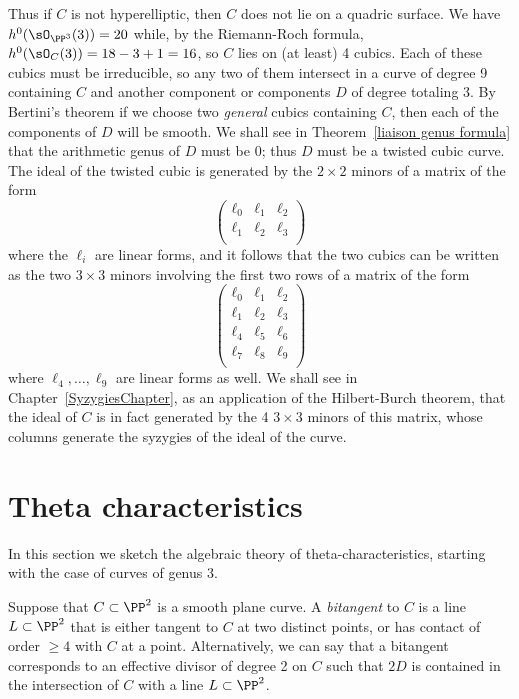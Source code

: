 Thus if $C$ is not hyperelliptic, then $C$ does not lie on a quadric surface. We have $h^0(\sO_{\PP^3}(3)) = 20$ while, by the Riemann-Roch formula, $h^0(\sO_C(3)) = 18-3+1= 16$, so $C$ lies on (at least) 4 cubics. Each of these cubics must be irreducible, so any two of them
intersect in a curve of degree 9 containing $C$ and another component or components $D$ of degree totaling 3. By Bertini's theorem
if we choose two \emph{general} cubics containing $C$, then each of the components of $D$ will be smooth. We shall see in Theorem~\ref{liaison genus formula} that the arithmetic genus of $D$ must be 0; thus $D$ must be a twisted cubic curve. The ideal of the twisted cubic is generated by the $2\times 2$ minors of a matrix of the form
$$
\begin{pmatrix}
 \ell_0& \ell_1&\ell_2\\
 \ell_1& \ell_2&\ell_3\\
\end{pmatrix}
$$
where the $\ell_i$ are linear forms,
and it follows that the two cubics can be written as the two $3\times 3$ minors involving the first two rows of  a matrix of the form
$$
\begin{pmatrix}
 \ell_0& \ell_1&\ell_2\\
 \ell_1& \ell_2&\ell_3\\
\ell_4& \ell_5&\ell_6\\
 \ell_7& \ell_8&\ell_9\\
\end{pmatrix}
$$
where $\ell_4,\dots,\ell_9$ are linear forms as well.
We shall see in Chapter~\ref{SyzygiesChapter}, as an application of the Hilbert-Burch theorem, that the ideal of $C$ is in fact generated by the 4 $3\times 3$ minors of this matrix, whose columns generate
the syzygies of the ideal of the curve.


\section{Theta characteristics}

In this section we sketch the algebraic theory of theta-characteristics, starting with the case of curves of genus 3.

Suppose that $C \subset \PP^2$ is a smooth plane curve. A \emph{bitangent} to $C$ is a line $L \subset \PP^2$ that is either tangent to $C$ at two distinct points, or has contact of order $\geq 4$ with $C$ at a point. Alternatively, we can say that a bitangent  corresponds to an effective divisor of degree 2 on $C$ such that $2D$ is contained in the intersection of $C$ with a line $L \subset \PP^2$.

